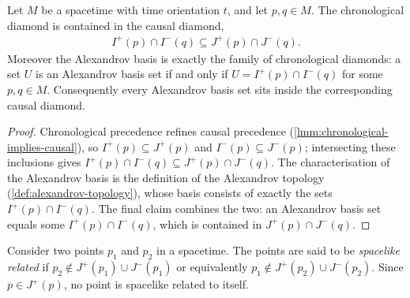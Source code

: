 \medskip

\begin{theorem}
    \label{thrm:causal-diamond-vs-chronological}
    \leanok
    Let $M$ be a spacetime with time orientation $t$, and let $p, q \in M$. The chronological diamond is contained in the causal diamond,
    \begin{align}
        I^+(p) \cap I^-(q) \subseteq J^+(p) \cap J^-(q).
    \end{align}
    Moreover the Alexandrov basis is exactly the family of chronological diamonds: a set $U$ is an Alexandrov basis set if and only if $U = I^+(p) \cap I^-(q)$ for some $p, q \in M$. Consequently every Alexandrov basis set sits inside the corresponding causal diamond.
\end{theorem}
\begin{proof}
    \leanok
    Chronological precedence refines causal precedence (\ref{lmm:chronological-implies-causal}), so $I^+(p) \subseteq J^+(p)$ and $I^-(p) \subseteq J^-(p)$; intersecting these inclusions gives $I^+(p) \cap I^-(q) \subseteq J^+(p) \cap J^-(q)$. The characterisation of the Alexandrov basis is the definition of the Alexandrov topology (\ref{def:alexandrov-topology}), whose basis consists of exactly the sets $I^+(p) \cap I^-(q)$. The final claim combines the two: an Alexandrov basis set equals some $I^+(p) \cap I^-(q)$, which is contained in $J^+(p) \cap J^-(q)$.
\end{proof}

\medskip

\begin{definition}
    \label{def:spacelike-related}
    \leanok
    Consider two points $p_1$ and $p_2$ in a spacetime. The points are said to be \textit{spacelike related} if $p_2 \notin J^+(p_1) \cup J^-(p_1)$ or equivalently $p_1 \notin J^+(p_2) \cup J^-(p_2)$. Since $p \in J^+(p)$, no point is spacelike related to itself.
\end{definition}

